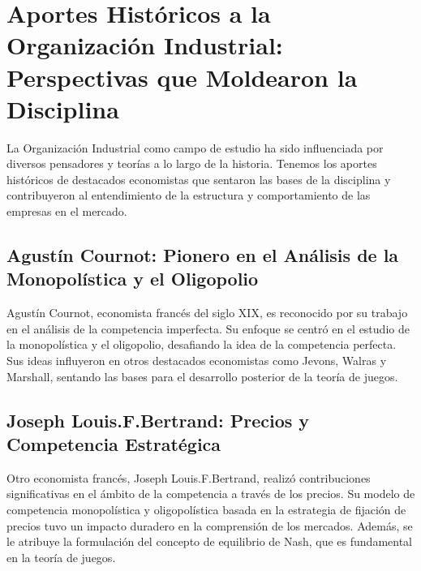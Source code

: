 \documentclass[
  letterpaper,
  DIV=11,
  numbers=noendperiod]{scrartcl}
\begin{document}
\hypertarget{aportes-histuxf3ricos-a-la-organizaciuxf3n-industrial-perspectivas-que-moldearon-la-disciplina}{%
\section{Aportes Históricos a la Organización Industrial: Perspectivas
que Moldearon la
Disciplina}\label{aportes-histuxf3ricos-a-la-organizaciuxf3n-industrial-perspectivas-que-moldearon-la-disciplina}}

La Organización Industrial como campo de estudio ha sido influenciada
por diversos pensadores y teorías a lo largo de la historia. Tenemos los
aportes históricos de destacados economistas que sentaron las bases de
la disciplina y contribuyeron al entendimiento de la estructura y
comportamiento de las empresas en el mercado.

\hypertarget{agustuxedn-cournot-pionero-en-el-anuxe1lisis-de-la-monopoluxedstica-y-el-oligopolio}{%
\subsection{Agustín Cournot: Pionero en el Análisis de la Monopolística
y el
Oligopolio}\label{agustuxedn-cournot-pionero-en-el-anuxe1lisis-de-la-monopoluxedstica-y-el-oligopolio}}

Agustín Cournot, economista francés del siglo XIX, es reconocido por su
trabajo en el análisis de la competencia imperfecta. Su enfoque se
centró en el estudio de la monopolística y el oligopolio, desafiando la
idea de la competencia perfecta. Sus ideas influyeron en otros
destacados economistas como Jevons, Walras y Marshall, sentando las
bases para el desarrollo posterior de la teoría de juegos.

\hypertarget{joseph-louis.f.bertrand-precios-y-competencia-estratuxe9gica}{%
\subsection{Joseph Louis.F.Bertrand: Precios y Competencia
Estratégica}\label{joseph-louis.f.bertrand-precios-y-competencia-estratuxe9gica}}

Otro economista francés, Joseph Louis.F.Bertrand, realizó contribuciones
significativas en el ámbito de la competencia a través de los precios.
Su modelo de competencia monopolística y oligopolística basada en la
estrategia de fijación de precios tuvo un impacto duradero en la
comprensión de los mercados. Además, se le atribuye la formulación del
concepto de equilibrio de Nash, que es fundamental en la teoría de
juegos.
\end{document}
